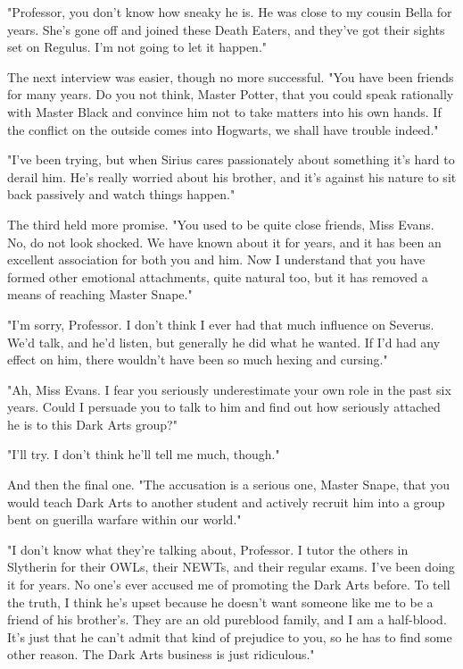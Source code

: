 \documentclass[a4paper,11pt]{article}
\begin{document}
"Professor, you don't know how sneaky he is. He was close to my cousin Bella for years. She's gone off and joined these Death Eaters, and they've got their sights set on Regulus. I'm not going to let it happen."

The next interview was easier, though no more successful. "You have been friends for many years. Do you not think, Master Potter, that you could speak rationally with Master Black and convince him not to take matters into his own hands. If the conflict on the outside comes into Hogwarts, we shall have trouble indeed."

"I've been trying, but when Sirius cares passionately about something it's hard to derail him. He's really worried about his brother, and it's against his nature to sit back passively and watch things happen."

The third held more promise. "You used to be quite close friends, Miss Evans. No, do not look shocked. We have known about it for years, and it has been an excellent association for both you and him. Now I understand that you have formed other emotional attachments, quite natural too, but it has removed a means of reaching Master Snape."

"I'm sorry, Professor. I don't think I ever had that much influence on Severus. We'd talk, and he'd listen, but generally he did what he wanted. If I'd had any effect on him, there wouldn't have been so much hexing and cursing."

"Ah, Miss Evans. I fear you seriously underestimate your own role in the past six years. Could I persuade you to talk to him and find out how seriously attached he is to this Dark Arts group?"

"I'll try. I don't think he'll tell me much, though."

And then the final one. "The accusation is a serious one, Master Snape, that you would teach Dark Arts to another student and actively recruit him into a group bent on guerilla warfare within our world."

"I don't know what they're talking about, Professor. I tutor the others in Slytherin for their OWLs, their NEWTs, and their regular exams. I've been doing it for years. No one's ever accused me of promoting the Dark Arts before. To tell the truth, I think he's upset because he doesn't want someone like me to be a friend of his brother's. They are an old pureblood family, and I am a half-blood. It's just that he can't admit that kind of prejudice to you, so he has to find some other reason. The Dark Arts business is just ridiculous."
\end{document}
